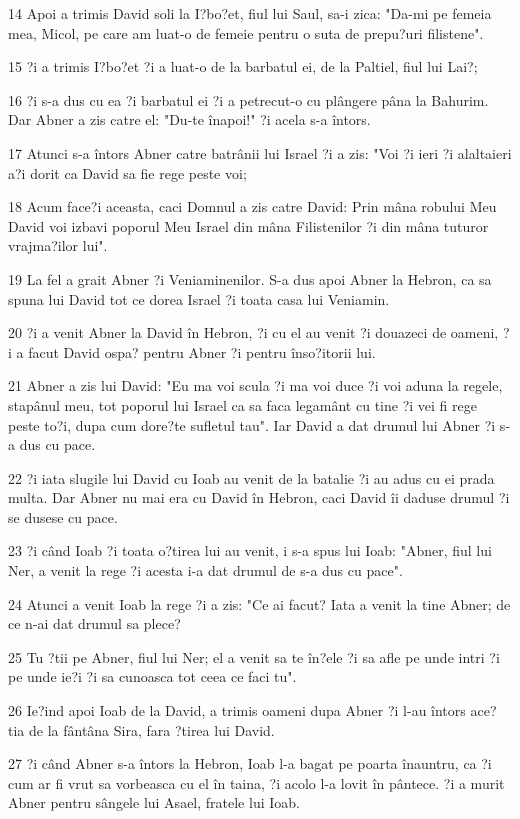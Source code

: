 \par 14 Apoi a trimis David soli la I?bo?et, fiul lui Saul, sa-i zica: "Da-mi pe femeia mea, Micol, pe care am luat-o de femeie pentru o suta de prepu?uri filistene".
\par 15 ?i a trimis I?bo?et ?i a luat-o de la barbatul ei, de la Paltiel, fiul lui Lai?;
\par 16 ?i s-a dus cu ea ?i barbatul ei ?i a petrecut-o cu plângere pâna la Bahurim. Dar Abner a zis catre el: "Du-te înapoi!" ?i acela s-a întors.
\par 17 Atunci s-a întors Abner catre batrânii lui Israel ?i a zis: "Voi ?i ieri ?i alaltaieri a?i dorit ca David sa fie rege peste voi;
\par 18 Acum face?i aceasta, caci Domnul a zis catre David: Prin mâna robului Meu David voi izbavi poporul Meu Israel din mâna Filistenilor ?i din mâna tuturor vrajma?ilor lui".
\par 19 La fel a grait Abner ?i Veniaminenilor. S-a dus apoi Abner la Hebron, ca sa spuna lui David tot ce dorea Israel ?i toata casa lui Veniamin.
\par 20 ?i a venit Abner la David în Hebron, ?i cu el au venit ?i douazeci de oameni, ?i a facut David ospa? pentru Abner ?i pentru înso?itorii lui.
\par 21 Abner a zis lui David: "Eu ma voi scula ?i ma voi duce ?i voi aduna la regele, stapânul meu, tot poporul lui Israel ca sa faca legamânt cu tine ?i vei fi rege peste to?i, dupa cum dore?te sufletul tau". Iar David a dat drumul lui Abner ?i s-a dus cu pace.
\par 22 ?i iata slugile lui David cu Ioab au venit de la batalie ?i au adus cu ei prada multa. Dar Abner nu mai era cu David în Hebron, caci David îi daduse drumul ?i se dusese cu pace.
\par 23 ?i când Ioab ?i toata o?tirea lui au venit, i s-a spus lui Ioab: "Abner, fiul lui Ner, a venit la rege ?i acesta i-a dat drumul de s-a dus cu pace".
\par 24 Atunci a venit Ioab la rege ?i a zis: "Ce ai facut? Iata a venit la tine Abner; de ce n-ai dat drumul sa plece?
\par 25 Tu ?tii pe Abner, fiul lui Ner; el a venit sa te în?ele ?i sa afle pe unde intri ?i pe unde ie?i ?i sa cunoasca tot ceea ce faci tu".
\par 26 Ie?ind apoi Ioab de la David, a trimis oameni dupa Abner ?i l-au întors ace?tia de la fântâna Sira, fara ?tirea lui David.
\par 27 ?i când Abner s-a întors la Hebron, Ioab l-a bagat pe poarta înauntru, ca ?i cum ar fi vrut sa vorbeasca cu el în taina, ?i acolo l-a lovit în pântece. ?i a murit Abner pentru sângele lui Asael, fratele lui Ioab.
